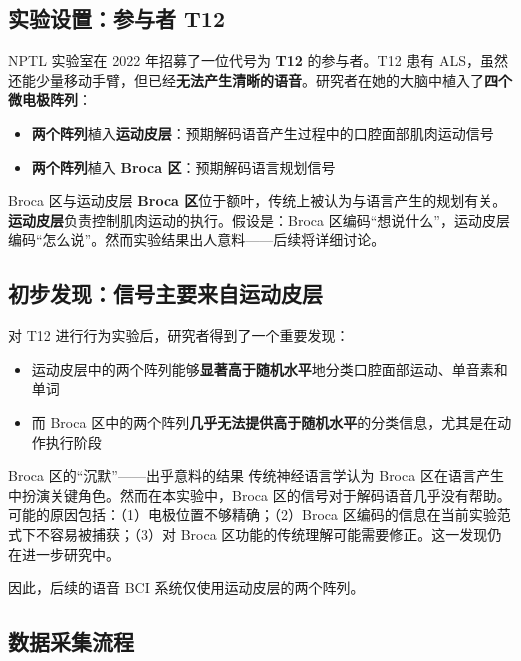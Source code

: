 \documentclass[a4paper]{article}
\begin{document}
\subsection{实验设置：参与者 T12}

NPTL 实验室在 2022 年招募了一位代号为 \textbf{T12} 的参与者。T12 患有 ALS，虽然还能少量移动手臂，但已经\textbf{无法产生清晰的语音}。研究者在她的大脑中植入了\textbf{四个微电极阵列}：

\begin{itemize}
    \item \textbf{两个阵列}植入\textbf{运动皮层}：预期解码语音产生过程中的口腔面部肌肉运动信号
    \item \textbf{两个阵列}植入 \textbf{Broca 区}：预期解码语言规划信号
\end{itemize}

\begin{knowledgebox}{Broca 区与运动皮层}
\textbf{Broca 区}位于额叶，传统上被认为与语言产生的规划有关。\textbf{运动皮层}负责控制肌肉运动的执行。假设是：Broca 区编码``想说什么''，运动皮层编码``怎么说''。然而实验结果出人意料——后续将详细讨论。
\end{knowledgebox}

\subsection{初步发现：信号主要来自运动皮层}

对 T12 进行行为实验后，研究者得到了一个重要发现：

\begin{itemize}
    \item 运动皮层中的两个阵列能够\textbf{显著高于随机水平}地分类口腔面部运动、单音素和单词
    \item 而 Broca 区中的两个阵列\textbf{几乎无法提供高于随机水平}的分类信息，尤其是在动作执行阶段
\end{itemize}

\begin{warningbox}{Broca 区的``沉默''——出乎意料的结果}
传统神经语言学认为 Broca 区在语言产生中扮演关键角色。然而在本实验中，Broca 区的信号对于解码语音几乎没有帮助。可能的原因包括：（1）电极位置不够精确；（2）Broca 区编码的信息在当前实验范式下不容易被捕获；（3）对 Broca 区功能的传统理解可能需要修正。这一发现仍在进一步研究中。
\end{warningbox}

因此，后续的语音 BCI 系统仅使用运动皮层的两个阵列。

\subsection{数据采集流程}
\end{document}
